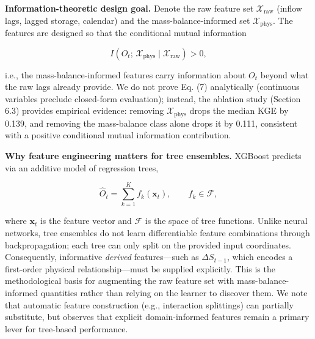 \documentclass[journal]{ascelike-new}
\begin{document}
\textbf{Information-theoretic design goal.} Denote the raw feature set $\mathcal{X}_{\text{raw}}$ (inflow lags, lagged storage, calendar) and the mass-balance-informed set $\mathcal{X}_{\text{phys}}$. The features are designed so that the conditional mutual information


\begin{equation}I\!\left(O_t;\, \mathcal{X}_{\text{phys}} \;\big|\; \mathcal{X}_{\text{raw}}\right) > 0, \tag{7}\end{equation}


i.e., the mass-balance-informed features carry information about $O_t$ beyond what the raw lags already provide. We do not prove Eq. (7) analytically (continuous variables preclude closed-form evaluation); instead, the ablation study (Section 6.3) provides empirical evidence: removing $\mathcal{X}_{\text{phys}}$ drops the median KGE by 0.139, and removing the mass-balance class alone drops it by 0.111, consistent with a positive conditional mutual information contribution.


\textbf{Why feature engineering matters for tree ensembles.} XGBoost \citep{Chen2016} predicts via an additive model of regression trees,


\begin{equation}\hat{O}_t = \sum_{k=1}^{K} f_k(\mathbf{x}_t), \qquad f_k \in \mathcal{F}, \tag{8}\end{equation}


where $\mathbf{x}_t$ is the feature vector and $\mathcal{F}$ is the space of tree functions. Unlike neural networks, tree ensembles do not learn differentiable feature combinations through backpropagation; each tree can only split on the provided input coordinates. Consequently, informative \emph{derived} features---such as $\Delta S_{t-1}$, which encodes a first-order physical relationship---must be supplied explicitly. This is the methodological basis for augmenting the raw feature set with mass-balance-informed quantities rather than relying on the learner to discover them. We note that automatic feature construction (e.g., interaction splittings) can partially substitute, but \citet{Breiman2001} observes that explicit domain-informed features remain a primary lever for tree-based performance.
\end{document}
